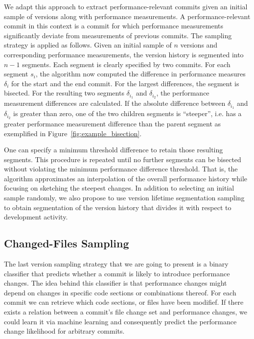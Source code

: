 We adapt this approach to extract performance-relevant commits given an initial
sample of versions along with performance measurements. A performance-relevant
commit in this context is a commit for which performance measurements
significantly deviate from measurements of previous commits. The sampling
strategy is applied as follows. Given an initial sample of $n$ versions and
corresponding performance measurements, the version history is segmented into
$n-1$ segments. Each segment is clearly specified by two commits. For each
segment $s_i$, the algorithm now computed the difference in performance
 measures $\delta_i$ for the start and the end commit. For the largest differences, the
segment is bisected. For the resulting two segments $\delta_{i_1}$ and
$\delta_{i_2}$, the performance measurement differences are calculated. If the
absolute difference between $\delta_{i_1}$ and  $\delta_{i_2}$ is greater than
zero, one of the two children segments is ``steeper'', i.e. has a greater
performance measurement difference than the parent segment as exemplified in
Figure~\ref{fig:example_bisection}.

One can specify a minimum threshold difference to retain those resulting
segments. This procedure is repeated until no further segments can be bisected without violating the
minimum performance difference threshold. That is, the algorithm approximates
an interpolation of the overall performance history while focusing on sketching
the steepest changes. In addition to selecting an initial sample randomly, we
also propose to use version lifetime segmentation sampling to obtain
segmentation of the version history that divides it with respect to development
activity.

\subsection{Changed-Files Sampling}
The last version sampling strategy that we are going to present is a binary
classifier that predicts whether a commit is likely to introduce performance
changes. The idea behind this classifier is that performance changes might
depend on changes in specific code sections or combinations thereof. For each
commit we can retrieve which code sections, or files have been modifief. If
there exists a relation between a commit’s file change set and performance
changes, we could learn it via machine learning and consequently predict
the performance change likelihood for arbitrary commits.

